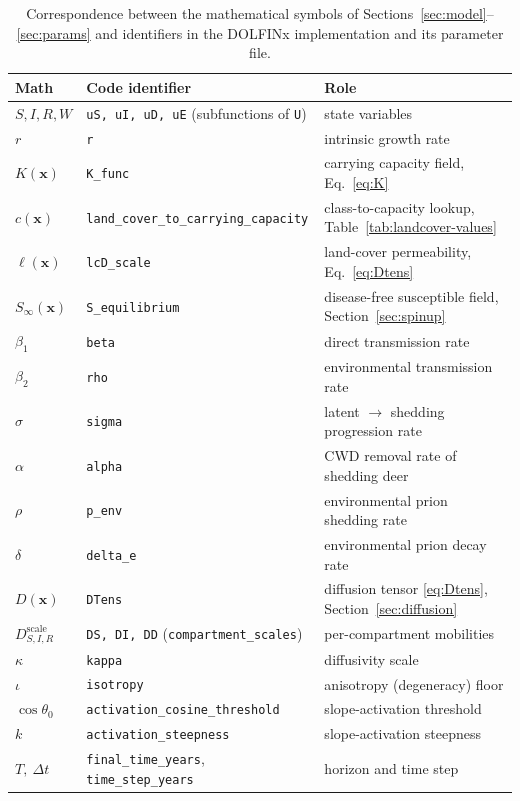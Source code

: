 \documentclass[11pt]{article}
\begin{document}
\begin{table}[h]
\centering
\small
\caption{Correspondence between the mathematical symbols of Sections~\ref{sec:model}--\ref{sec:params} and identifiers in the DOLFINx implementation and its parameter file.}
\label{tab:code-notation}
\begin{tabular}{@{}lll@{}}
\toprule
Math & Code identifier & Role \\
\midrule
$S,I,R,W$ & \texttt{uS, uI, uD, uE} (subfunctions of \texttt{U}) & state variables \\
$r$ & \texttt{r} & intrinsic growth rate \\
$K(\mathbf{x})$ & \texttt{K\_func} & carrying capacity field, Eq.~\eqref{eq:K} \\
$c(\mathbf{x})$ & \texttt{land\_cover\_to\_carrying\_capacity} & class-to-capacity lookup, Table~\ref{tab:landcover-values} \\
$\ell(\mathbf{x})$ & \texttt{lcD\_scale} & land-cover permeability, Eq.~\eqref{eq:Dtens} \\
$S_\infty(\mathbf{x})$ & \texttt{S\_equilibrium} & disease-free susceptible field, Section~\ref{sec:spinup} \\
$\beta_1$ & \texttt{beta} & direct transmission rate \\
$\beta_2$ & \texttt{rho} & environmental transmission rate \\
$\sigma$ & \texttt{sigma} & latent $\to$ shedding progression rate \\
$\alpha$ & \texttt{alpha} & CWD removal rate of shedding deer \\
$\rho$ & \texttt{p\_env} & environmental prion shedding rate \\
$\delta$ & \texttt{delta\_e} & environmental prion decay rate \\
$D(\mathbf{x})$ & \texttt{DTens} & diffusion tensor \eqref{eq:Dtens}, Section~\ref{sec:diffusion} \\
$D_{S,I,R}^{\text{scale}}$ & \texttt{DS, DI, DD} (\texttt{compartment\_scales}) & per-compartment mobilities \\
$\kappa$ & \texttt{kappa} & diffusivity scale \\
$\iota$ & \texttt{isotropy} & anisotropy (degeneracy) floor \\
$\cos\theta_0$ & \texttt{activation\_cosine\_threshold} & slope-activation threshold \\
$k$ & \texttt{activation\_steepness} & slope-activation steepness \\
$T,\ \Delta t$ & \texttt{final\_time\_years}, \texttt{time\_step\_years} & horizon and time step \\
\bottomrule
\end{tabular}
\end{table}
\end{document}
